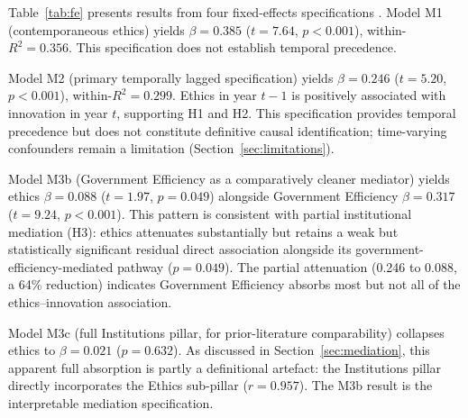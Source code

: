 \documentclass[pdflatex,sn-apa]{sn-jnl}
\begin{document}
Table~\ref{tab:fe} presents results from four fixed-effects specifications \citep{baltagi2005,wooldridge2010,hsiao2014}. Model M1 (contemporaneous ethics) yields $\beta=0.385$ ($t=7.64$, $p<0.001$), within-$R^2=0.356$. This specification does not establish temporal precedence.

Model M2 (primary temporally lagged specification) yields $\beta=0.246$ ($t=5.20$, $p<0.001$), within-$R^2=0.299$. Ethics in year $t-1$ is positively associated with innovation in year $t$, supporting H1 and H2. This specification provides temporal precedence but does not constitute definitive causal identification; time-varying confounders remain a limitation (Section~\ref{sec:limitations}).

Model M3b (Government Efficiency as a comparatively cleaner mediator) yields ethics $\beta=0.088$ ($t=1.97$, $p=0.049$) alongside Government Efficiency $\beta=0.317$ ($t=9.24$, $p<0.001$). This pattern is consistent with partial institutional mediation (H3): ethics attenuates substantially but retains a weak but statistically significant residual direct association alongside its government-efficiency-mediated pathway ($p=0.049$). The partial attenuation (0.246 to 0.088, a 64\% reduction) indicates Government Efficiency absorbs most but not all of the ethics--innovation association.

Model M3c (full Institutions pillar, for prior-literature comparability) collapses ethics to $\beta=0.021$ ($p=0.632$). As discussed in Section~\ref{sec:mediation}, this apparent full absorption is partly a definitional artefact: the Institutions pillar directly incorporates the Ethics sub-pillar ($r=0.957$). The M3b result is the interpretable mediation specification.
\end{document}
